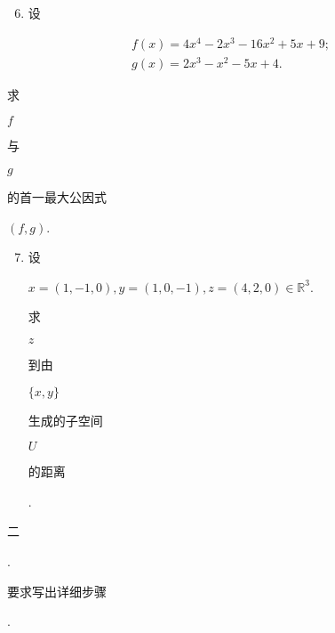 \documentclass[10pt]{article}
\begin{document}
\begin{enumerate}
  \setcounter{enumi}{5}
  \item \begin{CJK}{UTF8}{mj}设\end{CJK}
\end{enumerate}
$$
\begin{gathered}
f(x)=4 x^{4}-2 x^{3}-16 x^{2}+5 x+9 ; \\
g(x)=2 x^{3}-x^{2}-5 x+4 .
\end{gathered}
$$
\begin{CJK}{UTF8}{mj}求\end{CJK} $f$ \begin{CJK}{UTF8}{mj}与\end{CJK} $g$ \begin{CJK}{UTF8}{mj}的首一最大公因式\end{CJK} $(f, g)$.

\begin{enumerate}
  \setcounter{enumi}{6}
  \item \begin{CJK}{UTF8}{mj}设\end{CJK} $x=(1,-1,0), y=(1,0,-1), z=(4,2,0) \in \mathbb{R}^{3}$. \begin{CJK}{UTF8}{mj}求\end{CJK} $z$ \begin{CJK}{UTF8}{mj}到由\end{CJK} $\{x, y\}$ \begin{CJK}{UTF8}{mj}生成的子空间\end{CJK} $U$ \begin{CJK}{UTF8}{mj}的距离\end{CJK}.
\end{enumerate}
\begin{CJK}{UTF8}{mj}二\end{CJK}. \begin{CJK}{UTF8}{mj}要求写出详细步骤\end{CJK}.
\end{document}
